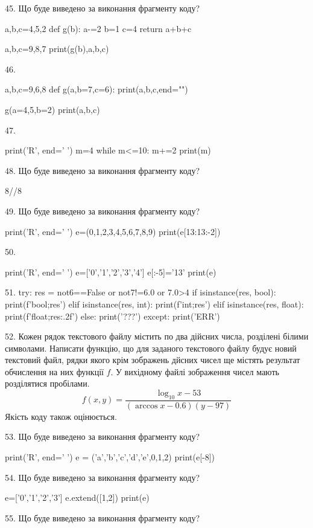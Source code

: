 \documentclass[11pt]{article}
\begin{document}
45. Що буде виведено за виконання фрагменту коду?

a,b,c=4,5,2
def g(b):
    a-=2
    b=1
    c=4
    return a+b+c

a,b,c=9,8,7
print(g(b),a,b,c)

46. 

a,b,c=9,6,8
def g(a,b=7,c=6):
    print(a,b,c,end="")

g(a=4,5,b=2)
print(a,b,c)


47. 

print('R', end=' ')
m=4
while m<=10:
    m+=2
print(m)


48. Що буде виведено за виконання фрагменту коду?

8//8%

49. Що буде виведено за виконання фрагменту коду?

print('R', end=' ')
e=(0,1,2,3,4,5,6,7,8,9)
print(e[13:13:-2])


50. 

print('R', end=' ')
e=['0','1','2','3','4']
e[:-5]='13'
print(e)


51. 
try:
    res = not6==False or not7!=6.0 or 7.0>4
    if isinstance(res, bool):
        print(f'bool;{res}')
    elif isinstance(res, int):
        print(f'int;{res}')
    elif isinstance(res, float):
        print(f'float;{res:.2f}')
    else:
        print('???')
except:
    print('ERR')

52. 
Кожен рядок текстового файлу містить по два дійсних числа, розділені білими символами.
Написати функцію, що для заданого текстового файлу будує новий текстовий файл, рядки якого крім зображень дйсних чисел ще містять результат обчислення на них функції $f$. У вихідному файлі зображення чисел мають розділятися пробілами. 
$$f(x, y) =\frac{\log_{10} x - 53}{(\arccos x - 0.6) (y - 97)}$$ 
Якість коду також оцінюється.


53. Що буде виведено за виконання фрагменту коду?

print('R', end=' ')
e = ('a','b','c','d','e',0,1,2)
print(e[-8])


54. Що буде виведено за виконання фрагменту коду?

e=['0','1','2','3']
e.extend([1,2])
print(e)


55. Що буде виведено за виконання фрагменту коду?
\end{document}
